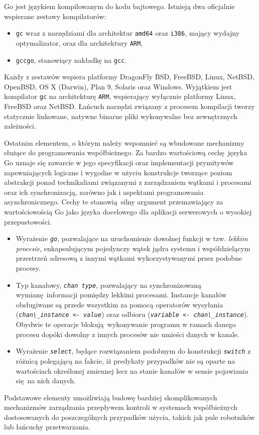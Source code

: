 \par{
  Go jest językiem kompilowanym do kodu bajtowego. Istnieją dwa oficjalnie wspierane zestawy kompilatorów:
  \begin{itemize}
    \item \texttt{gc} wraz z narzędziami dla architektur \texttt{amd64} oraz \texttt{i386}, mający wydajny optymalizator, oraz dla architektury \texttt{ARM},
    \item \texttt{gccgo}, stanowiący nakładkę na \texttt{gcc}.
  \end{itemize}
  Każdy z zestawów wspiera platformy DragonFly BSD, FreeBSD, Linux, NetBSD, OpenBSD, OS X (Darwin), Plan 9, Solaris oraz Windows. Wyjątkiem jest kompilator \texttt{gc} na architekturę \texttt{ARM}, wspierający wyłącznie platformy Linux, FreeBSD oraz NetBSD. \cite{godoc:compilers}
  Łańcuch narzędzi związany z procesem kompilacji tworzy statycznie linkowane, natywne binarne pliki wykonywalne bez zewnętrznych zależności.
}

\par{
  Ostatnim elementem, o którym należy wspomnieć są wbudowane mechanizmy służące do programowania współbieżnego.
  Za bardzo wartościową cechę języka Go uznaje się zawarcie w jego specyfikacji oraz implementacji prymitywów zapewniających logiczne i wygodne w użyciu konstrukcje tworzące poziom abstrakcji ponad technikaliami związanymi z zarządzaniem wątkami i procesami oraz ich synchronizacją, zarówno jak i aspektami programowania asynchronicznego.
  Cechy te stanowią silny argument przemawiający za wartościowością Go jako języka docelowego dla aplikacji serwerowych o wysokiej przepustowości.
  \begin{itemize}
    \item Wyrażenie \textit{\lstinline{go}}, pozwalające na uruchomienie dowolnej funkcji w tzw. \emph{lekkim procesie}, enkapsulującym pojedynczy wątek jądra systemu i współdzielącym przestrzeń adresową z innymi wątkami wykorzystywanymi przez podobne procesy.
    \item Typ kanałowy, \textit{\lstinline{chan type}}, pozwalający na synchronizowaną wymianę informacji pomiędzy lekkimi procesami. Instancje kanałów obsługiwane są przede wszystkim za pomocą operatorów wysyłania (\textit{\lstinline{chan\_instance <- value}}) oraz odbioru (\textit{\lstinline{variable <- chan\_instance}}). Obydwie te operacje blokują wykonywanie programu w ramach danego procesu dopóki dowolny z innych procesów nie umieści danych w kanale.
    \item Wyrażenie \textit{\lstinline{select}}, będące rozwiązaniem podobnym do konstrukcji \textit{\lstinline{switch}} z różnicą polegającą na fakcie, iż predykaty przypadków nie są oparte na wartościach określonej zmiennej lecz na stanie kanałów w sensie pojawiania się na nich danych.
  \end{itemize}
  Podstawowe elementy umożliwiają budowę bardziej skomplikowanych mechanizmów zarządzania przepływem kontroli w systemach współbieżnych dostosowanych do poszczególnych przypadków użycia, takich jak pule robotników lub łańcuchy przetwarzania.
}